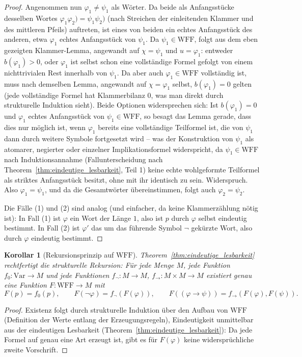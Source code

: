 \documentclass[12pt, a4paper]{article}
\newtheorem{corollary}[theorem]{Korollar}
\theoremstyle{definition}
\theoremstyle{remark}
\newcommand{\WFF}{\mathrm{WFF}}
\newcommand{\Var}{\mathrm{Var}}
\begin{document}
\begin{proof}
Angenommen nun $\varphi_1 \ne \psi_1$ als Wörter. Da beide als Anfangsstücke desselben Wortes $\varphi_1 \varphi_2) = \psi_1 \psi_2)$ (nach Streichen der einleitenden Klammer und des mittleren Pfeils) auftreten, ist eines von beiden ein echtes Anfangsstück des anderen, etwa $\varphi_1$ echtes Anfangsstück von $\psi_1$. Da $\psi_1 \in \WFF$, folgt aus dem eben gezeigten Klammer-Lemma, angewandt auf $\chi = \psi_1$ und $u = \varphi_1$: entweder $b(\varphi_1) > 0$, oder $\varphi_1$ ist selbst schon eine vollständige Formel gefolgt von einem nichttrivialen Rest innerhalb von $\psi_1$. Da aber auch $\varphi_1 \in \WFF$ vollständig ist, muss nach demselben Lemma, angewandt auf $\chi=\varphi_1$ selbst, $b(\varphi_1) = 0$ gelten (jede vollständige Formel hat Klammerbilanz $0$, was man direkt durch strukturelle Induktion sieht). Beide Optionen widersprechen sich: Ist $b(\varphi_1) = 0$ und $\varphi_1$ echtes Anfangsstück von $\psi_1 \in \WFF$, so besagt das Lemma gerade, dass dies nur möglich ist, wenn $\varphi_1$ bereits eine vollständige Teilformel ist, die von $\psi_1$ dann durch weitere Symbole fortgesetzt wird -- was der Konstruktion von $\psi_1$ als atomarer, negierter oder einzelner Implikationsformel widerspricht, da $\psi_1 \in \WFF$ nach Induktionsannahme (Fallunterscheidung nach Theorem~\ref{thm:eindeutige_lesbarkeit}, Teil 1) keine echte wohlgeformte Teilformel als striktes Anfangsstück besitzt, ohne mit ihr identisch zu sein. Widerspruch. Also $\varphi_1 = \psi_1$, und da die Gesamtwörter übereinstimmen, folgt auch $\varphi_2 = \psi_2$.

Die Fälle (1) und (2) sind analog (und einfacher, da keine Klammerzählung nötig ist): In Fall (1) ist $\varphi$ ein Wort der Länge $1$, also ist $p$ durch $\varphi$ selbst eindeutig bestimmt. In Fall (2) ist $\varphi'$ das um das führende Symbol $\neg$ gekürzte Wort, also durch $\varphi$ eindeutig bestimmt.
\end{proof}

\begin{corollary}[Rekursionsprinzip auf $\WFF$]
\label{cor:rekursion}
Theorem~\ref{thm:eindeutige_lesbarkeit} rechtfertigt die \emph{strukturelle Rekursion}: Für jede Menge $M$, jede Funktion $f_0 : \Var \to M$ und jede Funktionen $f_\neg : M \to M$, $f_\to : M \times M \to M$ existiert genau eine Funktion $F : \WFF \to M$ mit
\[
  F(p) = f_0(p), \qquad F(\neg\varphi) = f_\neg(F(\varphi)), \qquad F((\varphi\to\psi)) = f_\to(F(\varphi), F(\psi)).
\]
\end{corollary}
\begin{proof}
Existenz folgt durch strukturelle Induktion über den Aufbau von $\WFF$ (Definition der Werte entlang der Erzeugungsregeln), Eindeutigkeit unmittelbar aus der eindeutigen Lesbarkeit (Theorem~\ref{thm:eindeutige_lesbarkeit}): Da jede Formel auf genau eine Art erzeugt ist, gibt es für $F(\varphi)$ keine widersprüchliche zweite Vorschrift.
\end{proof}
\end{document}
